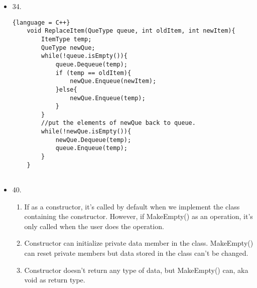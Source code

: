 \documentclass[11pt]{article} %
\begin{document}
\begin{itemize}
\begin{lstlisting}{language = C++}
    }
    \end{lstlisting}



\item 34.\\

\begin{lstlisting}{language = C++}
    void ReplaceItem(QueType queue, int oldItem, int newItem){
        ItemType temp;
        QueType newQue;
        while(!queue.isEmpty()){
            queue.Dequeue(temp);
            if (temp == oldItem){
                newQue.Enqueue(newItem);
            }else{
                newQue.Enqueue(temp);
            }
        }
        //put the elements of newQue back to queue.
        while(!newQue.isEmpty()){
            newQue.Dequeue(temp);
            queue.Enqueue(temp);
        }
    }
    
\end{lstlisting}

\item 40.\\
\begin{enumerate}
    \item If as a constructor, it's called by default when we implement the class containing the constructor. However, if MakeEmpty() as an operation,
    it's only called when the user does the operation. 
    \item Constructor can initialize private data member in the class. MakeEmpty() can reset private members but data stored in the class can't be changed.
    \item Constructor doesn't return any type of data, but MakeEmpty() can, aka void as return type.
\end{enumerate}

\end{itemize}
\end{document}

